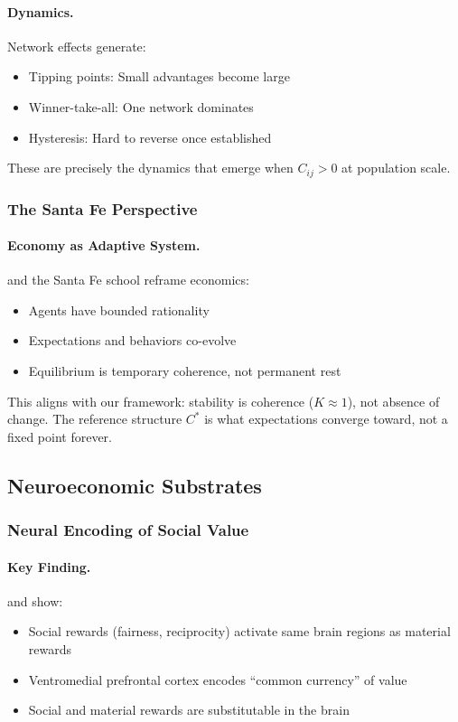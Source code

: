 \documentclass[12pt,a4paper]{article}
\begin{document}
\paragraph{Dynamics.}
Network effects generate:
\begin{itemize}
  \item Tipping points: Small advantages become large
  \item Winner-take-all: One network dominates
  \item Hysteresis: Hard to reverse once established
\end{itemize}

These are precisely the dynamics that emerge when $C_{ij} > 0$ at population scale.

\subsubsection{The Santa Fe Perspective}

\paragraph{Economy as Adaptive System.}
\citet{arthur2015} and the Santa Fe school reframe economics:
\begin{itemize}
  \item Agents have bounded rationality
  \item Expectations and behaviors co-evolve
  \item Equilibrium is temporary coherence, not permanent rest
\end{itemize}

This aligns with our framework: stability is coherence ($K \approx 1$),
not absence of change. The reference structure $C^*$ is what expectations
converge toward, not a fixed point forever.

\subsection{Neuroeconomic Substrates}

\subsubsection{Neural Encoding of Social Value}

\paragraph{Key Finding.}
\citet{rangelshadcam2008} and \citet{fehrcamerer2007} show:
\begin{itemize}
  \item Social rewards (fairness, reciprocity) activate same brain regions as material rewards
  \item Ventromedial prefrontal cortex encodes ``common currency'' of value
  \item Social and material rewards are substitutable in the brain
\end{itemize}
\end{document}
